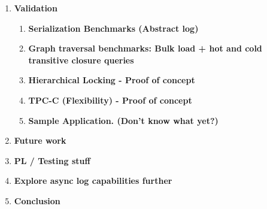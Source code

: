 \documentclass[letterpaper,english]{article}
\begin{document}
\begin{enumerate}
\begin{enumerate}
\end{enumerate}

\item {\bf Validation }

\begin{enumerate}

  \item {\bf Serialization Benchmarks (Abstract log) }

    
 



  \item {\bf Graph traversal benchmarks:  Bulk load + hot and cold transitive closure queries}

  \item {\bf Hierarchical Locking - Proof of concept}

  \item {\bf TPC-C (Flexibility) - Proof of concept}
    

  \item {\bf Sample Application. (Don't know what yet?) }

\end{enumerate}

\item {\bf Future work}
  \item {\bf PL / Testing stuff}
  \item {\bf Explore async log capabilities further}

\item {\bf Conclusion}

\end{enumerate}
\end{document}
